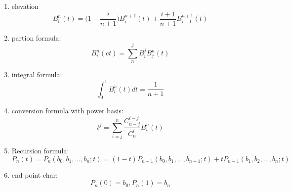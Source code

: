 \begin{enumerate}
	\item elevation \begin{equation*}
		      B_{i}^{n}(t) = {(1 -\frac{i}{n+1}})B_{i}^{n+1}(t)+\frac{i+1}{n+1}B_{i-1}^{n+1}(t)
	      \end{equation*}
	\item partion formula:\begin{equation*}
		      B_{i}^{n}(ct) = \sum_{n}^{j}B_{i}^{j}B_{j}^{n}(t)
	      \end{equation*}

	\item integral formula:\begin{equation*}
		      \int_{0}^{1}B_{i}^{n}(t)dt = \frac{1}{n+1}
	      \end{equation*}
	\item conversion formula with power basis:\begin{equation*}
		      t^j = \sum_{i=j}^{n}\frac{C_{n-j}^{i-j}}{C_{n}^{i}}B_{i}^{n}(t)
	      \end{equation*}
	\item Recursion formula:\begin{equation*}
		      P_n(t) = P_n(b_0,b_1,...,b_n;t) = (1-t)P_{n-1}(b_0,b_1,...,b_{n-1};t)+tP_{n-1}(b_1,b_2,...,b_n;t)
	      \end{equation*}
	\item end point char:\begin{equation*}
		      P_n(0) = b_0,P_n(1) = b_n
	      \end{equation*}
\end{enumerate}

